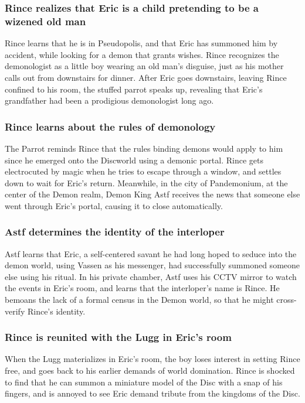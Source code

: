 \subsubsection{\Gls{Rince} realizes that \Gls{Eric} is a child pretending to be a wizened old man}
\Gls{Rince} learns that he is in Pseudopolis, and that \Gls{Eric} has summoned him by accident,
while looking for a demon that grants wishes. \Gls{Rince} recognizes the demonologist as a little
boy wearing an old man's disguise, just as his mother calls out from downstairs for dinner. After
\Gls{Eric} goes downstairs, leaving \Gls{Rince} confined to his room, the stuffed parrot speaks up,
revealing that \Gls{Eric}'s grandfather had been a prodigious demonologist long ago.

\subsubsection{\Gls{Rince} learns about the rules of demonology}
The \Gls{Parrot} reminds \Gls{Rince} that the rules binding demons would apply to him since he
emerged onto the Discworld using a demonic portal. \Gls{Rince} gets electrocuted by magic when he
tries to escape through a window, and settles down to wait for \Gls{Eric}'s return. Meanwhile, in
the city of Pandemonium, at the center of the Demon realm, Demon King \Gls{Astf} receives the news
that someone else went through \Gls{Eric}'s portal, causing it to close automatically.

\subsubsection{\Gls{Astf} determines the identity of the interloper}
\Gls{Astf} learns that \Gls{Eric}, a self-centered savant he had long hoped to seduce into the
demon world, using \Gls{Vassen} as his messenger, had successfully summoned someone else using his
ritual. In his private chamber, \Gls{Astf} uses his CCTV mirror to watch the events in \Gls{Eric}'s
room, and learns that the interloper's name is \Gls{Rince}. He bemoans the lack of a formal census
in the Demon world, so that he might cross-verify \Gls{Rince}'s identity.

\subsubsection{\Gls{Rince} is reunited with the \Gls{Lugg} in \Gls{Eric}'s room}
When the \Gls{Lugg} materializes in \Gls{Eric}'s room, the boy loses interest in setting \Gls{Rince}
free, and goes back to his earlier demands of world domination. \Gls{Rince} is shocked to find that
he can summon a miniature model of the Disc with a snap of his fingers, and is annoyed to see
\Gls{Eric} demand tribute from the kingdoms of the Disc.

